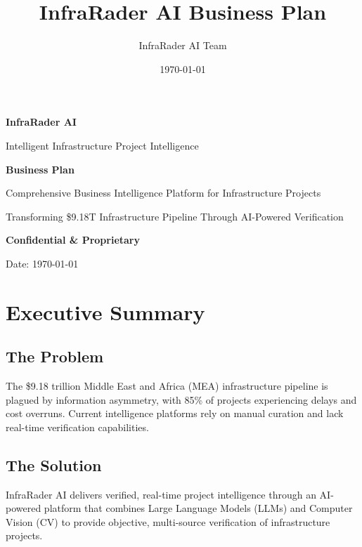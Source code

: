 \documentclass[business]{../templates/infraradar-main}
\title{InfraRader AI Business Plan}
\author{InfraRader AI Team}
\date{\today}
\begin{document}
\begin{titlepage}
    \centering
    \vspace*{2cm}
    
    {\Huge\bfseries\color{infraradar@primary} InfraRader AI\par}
    \vspace{0.5cm}
    {\Large\color{infraradar@text} Intelligent Infrastructure Project Intelligence\par}
    \vspace{2cm}
    
    {\huge\bfseries Business Plan\par}
    \vspace{1cm}
    
    {\large Comprehensive Business Intelligence Platform for Infrastructure Projects\par}
    \vspace{2cm}
    
    {\large Transforming \$9.18T Infrastructure Pipeline Through AI-Powered Verification\par}
    \vspace{3cm}
    
    {\large\bfseries\color{infraradar@primary} Confidential \& Proprietary\par}
    {\large Date: \today\par}
    
\end{titlepage}

\tableofcontents
\newpage

\section{Executive Summary}

\subsection{The Problem}
The \$9.18 trillion Middle East and Africa (MEA) infrastructure pipeline is plagued by information asymmetry, with 85\% of projects experiencing delays and cost overruns. Current intelligence platforms rely on manual curation and lack real-time verification capabilities.

\subsection{The Solution}
InfraRader AI delivers verified, real-time project intelligence through an AI-powered platform that combines Large Language Models (LLMs) and Computer Vision (CV) to provide objective, multi-source verification of infrastructure projects.
\end{document}
